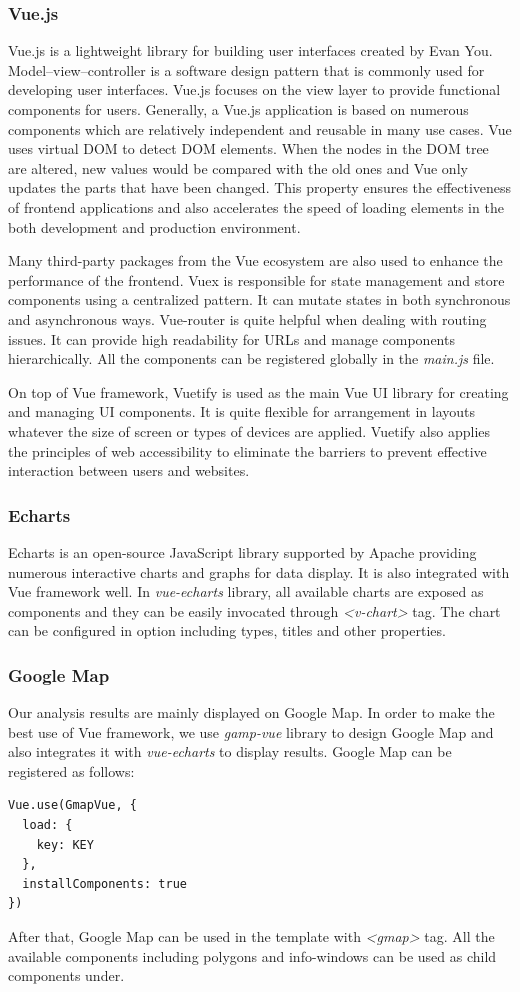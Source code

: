 \documentclass[parskip=full, 11pt]{article}
\begin{document}
\subsubsection{Vue.js}
Vue.js is a lightweight library for building user interfaces created by Evan You. Model–view–controller is a software design pattern that is commonly used for developing user interfaces. Vue.js focuses on the view layer to provide functional components for users. Generally, a Vue.js application is based on numerous components which are relatively independent and reusable in many use cases. Vue uses virtual DOM to detect DOM elements. When the nodes in the DOM tree are altered, new values would be compared with the old ones and Vue only updates the parts that have been changed. This property ensures the effectiveness of frontend applications and also accelerates the speed of loading elements in the both development and production environment.

Many third-party packages from the Vue ecosystem are also used to enhance the performance of the frontend. Vuex is responsible for state management and store components using a centralized pattern. It can mutate states in both synchronous and asynchronous ways. Vue-router is quite helpful when dealing with routing issues. It can provide high readability for URLs and manage components hierarchically. All the components can be registered globally in the \emph{main.js} file.

On top of Vue framework, Vuetify is used as the main Vue UI library for creating and managing UI components. It is quite flexible for arrangement in layouts whatever the size of screen or types of devices are applied. Vuetify also applies the principles of web accessibility to eliminate the barriers to prevent effective interaction between users and websites.
\subsubsection{Echarts}
Echarts is an open-source JavaScript library supported by Apache providing numerous interactive charts and graphs for data display. It is also integrated with Vue framework well. In \emph{vue-echarts} library, all available charts are exposed as components and they can be easily invocated through \emph{\textless{}v-chart\textgreater{}} tag. The chart can be configured in option including types, titles and other properties.
\subsubsection{Google Map}
Our analysis results are mainly displayed on Google Map. In order to make the best use of Vue framework, we use \emph{gamp-vue} library to design Google Map and also integrates it with \emph{vue-echarts} to display results. Google Map can be registered as follows:
\begin{lstlisting}
Vue.use(GmapVue, {
  load: {
    key: KEY
  },
  installComponents: true
})
\end{lstlisting}
After that, Google Map can be used in the template with \emph{\textless{}gmap\textgreater{}} tag. All the available components including polygons and info-windows can be used as child components under.
\end{document}
